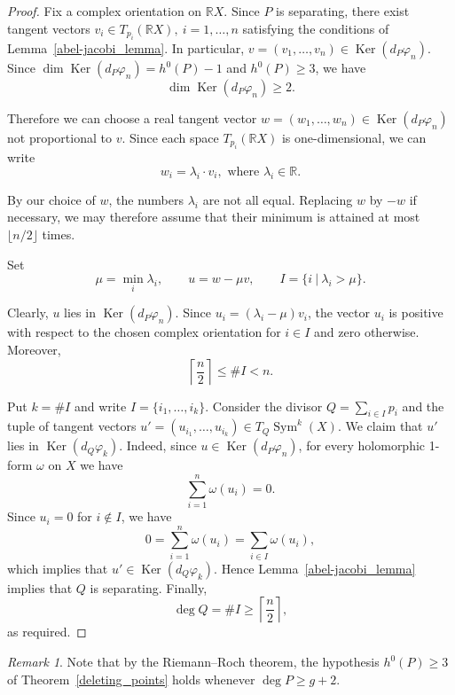 \documentclass[x11names,oneside,11pt]{amsart}
\theoremstyle{definition}
\theoremstyle{remark}
\newtheorem{remark}{Remark}
\DeclareMathOperator{\Sym}{Sym}
\DeclareMathOperator{\Ker}{Ker}
\newcommand{\R}{\mathbb{R}}
\begin{document}
  \begin{proof}
    Fix a complex orientation on $\R X$. Since $P$ is separating, there exist tangent vectors $v_i \in T_{p_i}(\R X), \ i = 1, \ldots, n$ satisfying the conditions of Lemma~\ref{abel-jacobi_lemma}. In particular, $v = (v_1,\ldots,v_n) \in \Ker(d_{P}\varphi_n)$.  Since $\dim{\Ker(d_{P}\varphi_n)} = h^0(P)-1$  and $h^0(P) \geqslant 3$, we have
    \[
      \dim{\Ker(d_{P}\varphi_n)} \geqslant 2.
    \] 

    Therefore we can choose a real tangent vector $w = (w_1, \ldots, w_n) \in \Ker(d_{P}\varphi_n)$ not proportional to $v$. Since each space $T_{p_i}(\R X)$ is one-dimensional, we can write
    \[
        w_i = \lambda_i \cdot v_i, \text{ where } \lambda_i \in \R.
    \]

    By our choice of $w$, the numbers $\lambda_i$ are not all equal. Replacing $w$ by $-w$ if necessary, we may therefore assume that their minimum is attained at most $\lfloor n/2\rfloor$ times.

    Set
    \[
        \mu=\min_i\lambda_i,
        \qquad
        u=w-\mu v,
        \qquad
        I=\{i \ \vert \ \lambda_i>\mu\}.
    \]

    Clearly, $u$ lies in $\Ker(d_{P}\varphi_n)$. Since $u_i = (\lambda_i - \mu) v_i$, the vector $u_i$ is positive with respect to the chosen complex orientation for $i\in I$ and zero otherwise. Moreover,
    \[
        \left\lceil\frac n2\right\rceil \leqslant \#I <n.
    \]

    Put $k=\# I$ and write $I = \{ i_1, \ldots, i_k\}$.  Consider the divisor $Q=\sum_{i\in I}p_i$ and the tuple of tangent vectors $u'= (u_{i_1}, \ldots, u_{i_{k}})\in T_Q\Sym^k(X)$. We claim that $u'$ lies in $\Ker(d_{Q}\varphi_k)$. Indeed, since $u \in \Ker(d_{P}\varphi_n)$, for every holomorphic 1-form $\omega$ on $X$ we have 
    \[
        \sum_{i=1}^n \omega(u_i) = 0.
    \]
    Since $u_i = 0$ for $i \notin I$, we have
    \[
        0=\sum_{i=1}^n \omega(u_i)  = \sum_{i \in I} \omega(u_i),
    \]
    which implies that $u' \in \Ker(d_{Q}\varphi_k)$.  Hence Lemma~\ref{abel-jacobi_lemma} implies  that $Q$ is separating. Finally,
    \[
        \deg Q=\# I \geqslant\left\lceil\frac n2\right\rceil,
    \]
    as required.
  \end{proof} 

  \begin{remark}\label{degree_g+2}
    Note that by the Riemann--Roch theorem, the hypothesis $h^0(P)\geqslant3$ of Theorem~\ref{deleting_points} holds whenever $\deg P\geqslant g+2$.
  \end{remark}
\end{document}
